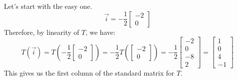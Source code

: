 \documentclass{ximera}
\begin{document}
\begin{example}
\begin{explanation}
Let's start with the easy one.  
$$\vec{i}=-\frac{1}{2}\begin{bmatrix}-2\\0\end{bmatrix}$$
Therefore, by linearity of $T$, we have:
$$T(\vec{i})=T\left(-\frac{1}{2}\begin{bmatrix}-2\\0\end{bmatrix}\right)=-\frac{1}{2}T\left(\begin{bmatrix}-2\\0\end{bmatrix}\right)=-\frac{1}{2}\begin{bmatrix}-2\\0\\-8\\2\end{bmatrix}=\begin{bmatrix}1\\0\\4\\-1\end{bmatrix}$$
This gives us the first column of the standard matrix for $T$.


\end{explanation}
\end{example}
\end{document}
